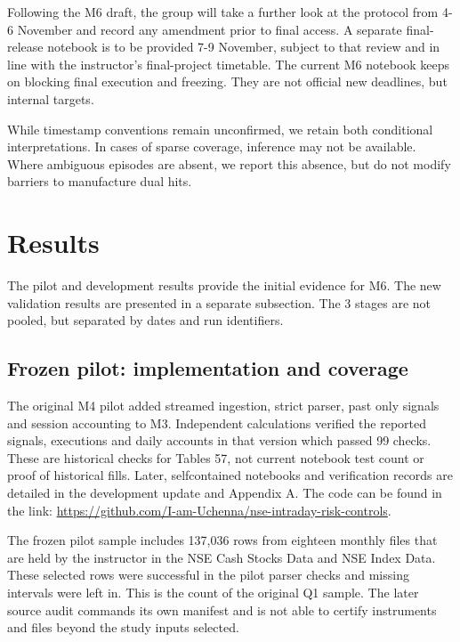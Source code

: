 \documentclass[11pt,a4paper]{article}
\begin{document}
Following the M6 draft, the group will take a further look at the protocol from 4-6 November and record any amendment prior to final access. A separate final-release notebook is to be provided 7-9 November, subject to that review and in line with the instructor's final-project timetable. The current M6 notebook keeps on blocking final execution and freezing. They are not official new deadlines, but internal targets.

While timestamp conventions remain unconfirmed, we retain both conditional interpretations. In cases of sparse coverage, inference may not be available. Where ambiguous episodes are absent, we report this absence, but do not modify barriers to manufacture dual hits.

\section*{Results}

The pilot and development results provide the initial evidence for M6. The new validation results are presented in a separate subsection. The 3 stages are not pooled, but separated by dates and run identifiers.

\subsection*{Frozen pilot: implementation and coverage}

The original M4 pilot added streamed ingestion, strict parser, past only signals and session accounting to M3. Independent calculations verified the reported signals, executions and daily accounts in that version which passed 99 checks. These are historical checks for Tables 5\allowbreak{}7, not current notebook test count or proof of historical fills. Later, self\allowbreak{}contained notebooks and verification records are detailed in the development update and Appendix A. The code can be found in the link: \url{https://github.com/I-am-Uchenna/nse-intraday-risk-controls}.

The frozen pilot sample includes 137,036 rows from eighteen monthly files that are held by the instructor in the NSE Cash Stocks Data and NSE Index Data. These selected rows were successful in the pilot parser checks and missing intervals were left in. This is the count of the original Q1 sample. The later source audit commands its own manifest and is not able to certify instruments and files beyond the study inputs selected.
\end{document}

